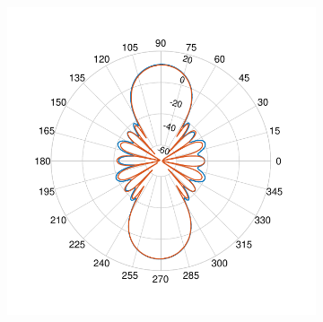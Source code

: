 \documentclass[12pt,a4paper]{article}
\begin{document}
{\begin{figure}
\begin{center}
\begin{subfigure}{0.25\linewidth}
		\includegraphics[scale=0.5]{pcb_pifa_array_elevation_90_comparison.pdf}
		\caption{}
	\end{subfigure}


\end{center}
\end{figure}}
\end{document}
